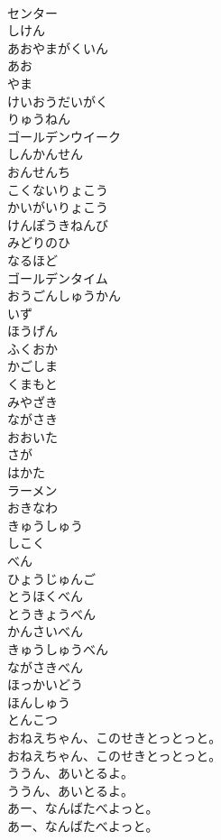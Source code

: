 \documentclass[8pt]{extreport}
\begin{document}
\begin{CJK}{UTF8}{min}
\\	センター
\\	しけん
\\	あおやまがくいん
\\	あお
\\	やま
\\	けいおうだいがく
\\	りゅうねん
\\	ゴールデンウイーク
\\	しんかんせん
\\	おんせんち
\\	こくないりょこう
\\	かいがいりょこう
\\	けんぽうきねんび
\\	みどりのひ
\\	なるほど
\\	ゴールデンタイム
\\	おうごんしゅうかん
\\	いず
\\	ほうげん
\\	ふくおか
\\	かごしま
\\	くまもと
\\	みやざき
\\	ながさき
\\	おおいた
\\	さが
\\	はかた
\\	ラーメン
\\	おきなわ
\\	きゅうしゅう
\\	しこく
\\	べん
\\	ひょうじゅんご
\\	とうほくべん
\\	とうきょうべん
\\	かんさいべん
\\	きゅうしゅうべん
\\	ながさきべん
\\	ほっかいどう
\\	ほんしゅう
\\	とんこつ
\\	おねえちゃん、このせきとっとっと。	
\\	おねえちゃん、このせきとっとっと。 
\\	ううん、あいとるよ。	
\\	ううん、あいとるよ。 
\\	あー、なんばたべよっと。	
\\	あー、なんばたべよっと。 

\end{CJK}
\end{document}
